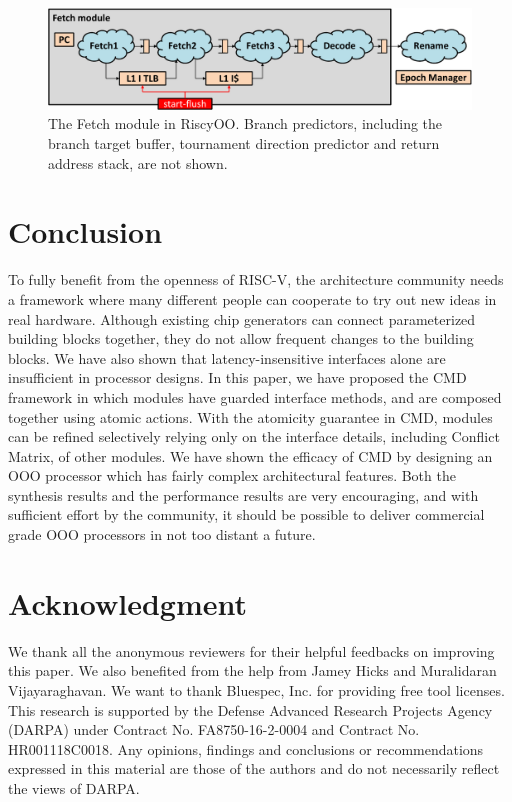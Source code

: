 \documentclass[conference]{IEEEtran}
\begin{document}
\begin{figure}[!htb]
    \centering
    \includegraphics[width=\columnwidth]{figs/fetch_cropped.pdf}
    \caption{The Fetch module in RiscyOO. Branch predictors, including the branch target buffer, tournament direction predictor and return address stack, are not shown.}\label{fig:fetch}
\end{figure}

\section{Conclusion}\label{sec:conclude}
To fully benefit from the openness of RISC-V, the architecture community needs a framework where many different people can cooperate to try out new ideas in real hardware.
Although existing chip generators can connect parameterized building blocks together,  they do not allow frequent changes to the building blocks.
We have also shown that latency-insensitive interfaces alone are insufficient in processor designs.
In this paper, we have proposed the CMD framework in which modules have guarded interface methods, and are composed together using atomic actions. 
With the atomicity guarantee in CMD, modules can be refined selectively relying only on the interface details, including Conflict Matrix, of other modules.
We have shown the efficacy of CMD by designing an OOO processor which has fairly complex architectural features.
Both the synthesis results and the performance results are very encouraging, and with sufficient effort by the community, it should be possible to deliver commercial grade OOO processors in not too distant a future.

\section*{Acknowledgment}
We thank all the anonymous reviewers for their helpful feedbacks on improving this paper.
We also benefited from the help from Jamey Hicks and Muralidaran Vijayaraghavan.
We want to thank Bluespec, Inc. for providing free tool licenses.
This research is supported by the Defense Advanced Research Projects Agency (DARPA) under Contract No. FA8750-16-2-0004 and Contract No. HR001118C0018.
Any opinions, findings and conclusions or recommendations expressed in this material are those of the authors and do not necessarily reflect the views of DARPA.



\end{document}
